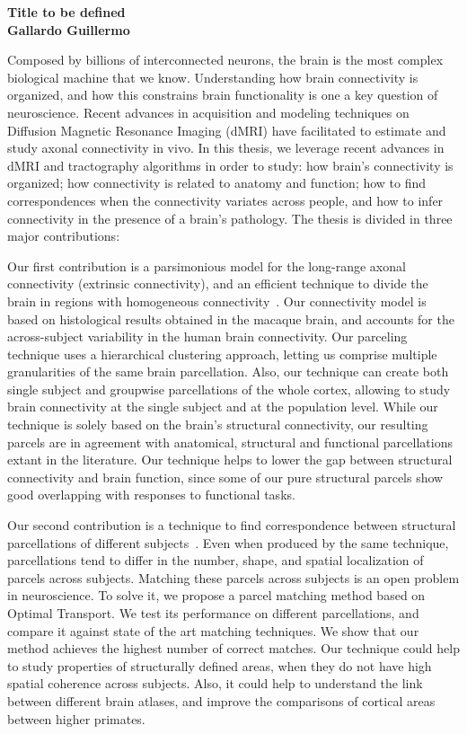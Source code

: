 \documentclass[a4paper, 10pt]{article}
\begin{document}
\begin{center}
{\Large \bf {\centering Title to be defined}} \\
{\vspace{1mm} \bf Gallardo Guillermo}
\end{center}

Composed by billions of interconnected neurons, the brain is the most complex
biological machine that we know. Understanding how brain connectivity is 
organized, and how this constrains brain functionality is one a key question
of neuroscience. Recent advances in acquisition and modeling techniques on
Diffusion Magnetic Resonance Imaging (dMRI) have facilitated to estimate and
study axonal connectivity in vivo. In this thesis, we leverage recent advances
in dMRI and tractography algorithms in order to study: how brain's connectivity
is organized; how connectivity is related to anatomy and function; how to
find correspondences when the connectivity variates across people, and how to
infer connectivity in the presence of a brain's pathology. The thesis is
divided in three major contributions:

Our first contribution is a parsimonious model for the long-range axonal
connectivity (extrinsic connectivity), and an efficient technique to divide the
brain in regions with homogeneous connectivity~\cite{Gallardo2017a}. Our
connectivity model is based on histological results obtained in the macaque
brain, and accounts for the across-subject variability in the human brain
connectivity. Our parceling technique uses a hierarchical clustering approach,
letting us comprise multiple granularities of the same brain parcellation.
Also, our technique can create both single subject and groupwise parcellations
of the whole cortex, allowing to study brain connectivity at the single subject
and at the population level. While our technique is solely based on the brain's
structural connectivity, our resulting parcels are in agreement with anatomical,
structural and functional parcellations extant in the literature. Our technique
helps to lower the gap between structural connectivity and brain function, since
some of our pure structural parcels show good overlapping with responses to
functional tasks.

Our second contribution is a technique to find correspondence between
structural parcellations of different subjects~\cite{Gallardo2018}. Even when
produced by the same technique, parcellations tend to differ in the
number, shape, and spatial localization of parcels across subjects. Matching
these parcels across subjects is an open problem in neuroscience. To solve
it, we propose a parcel matching method based on Optimal Transport. We test its
performance on different parcellations, and compare it against state of the
art matching techniques. We show that our method achieves the highest number
of correct matches. Our technique could help to study properties of structurally
defined areas, when they do not have high spatial coherence across subjects.
Also, it could help to understand the link between different brain atlases, and
improve the comparisons of cortical areas between higher primates.
\end{document}
